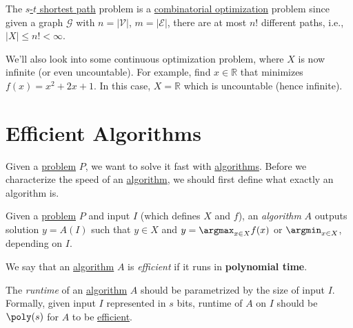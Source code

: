 \begin{eg}
	The \hyperref[eg:s-t-path]{\(s\)-\(t\) shortest path} problem is a \hyperref[def:combinatorial-optimization]{combinatorial optimization} problem since given a graph \(\mathcal{G} \) with \(n = \left\vert \mathcal{V}  \right\vert \), \(m = \left\vert \mathcal{E}  \right\vert \), there are at most \(n!\) different paths, i.e., \(\left\vert X \right\vert \leq n! < \infty\).
\end{eg}

\begin{note}
	We'll also look into some continuous optimization problem, where \(X\) is now infinite (or even uncountable). For example, find \(x\in \mathbb{R} \) that minimizes \(f(x)=x^{2} +2x + 1\). In this case, \(X = \mathbb{R} \) which is uncountable (hence infinite).
\end{note}

\section{Efficient Algorithms}

Given a \hyperref[def:computational-problem]{problem} \(P\), we want to solve it fast with \hyperref[def:algorithm]{algorithms}. Before we characterize the speed of an \hyperref[def:algorithm]{algorithm}, we should first define what exactly an algorithm is.

\begin{definition}[Algorithm]\label{def:algorithm}
	Given a \hyperref[def:computational-problem]{problem} \(P\) and input \(I\) (which defines \(X\) and \(f\)), an \emph{algorithm} \(A\) outputs solution \(y = A(I)\) such that \(y\in X\) and \(y = \argmax_{x\in X} f(x)\) or \(\argmin_{x\in X}\), depending on \(I\).
\end{definition}

\begin{definition}[Efficient]\label{def:efficient}
	We say that an \hyperref[def:algorithm]{algorithm} \(A\) is \emph{efficient} if it runs in \textbf{polynomial time}.
\end{definition}

\begin{remark}
	The \emph{runtime} of an \hyperref[def:algorithm]{algorithm} \(A\) should be parametrized by the size of input \(I\). Formally, given input \(I\) represented in \(s\) bits, runtime of \(A\) on \(I\) should be \(\poly(s)\) for \(A\) to be \hyperref[def:efficient]{efficient}.
\end{remark}

